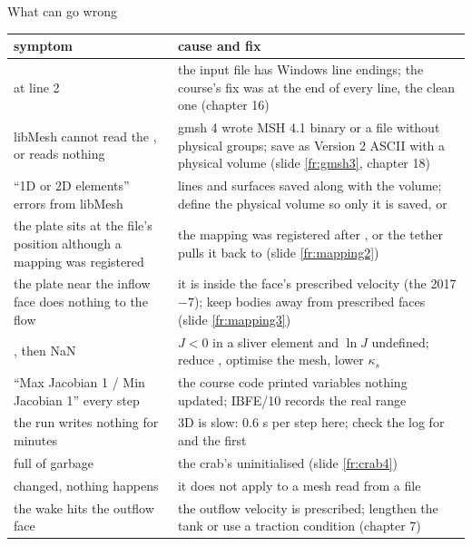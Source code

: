 \documentclass[aspectratio=169,11pt]{beamer}
\begin{document}
\begin{frame}{What can go wrong}
\label{fr:wrong}
\scriptsize
\renewcommand{\arraystretch}{0.92}
\begin{tabular}{@{}L{0.40\textwidth}L{0.52\textwidth}@{}}
\toprule
symptom & cause and fix \\
\midrule
{} at line 2 & the input file has Windows line endings; the course's fix was \code{//} at the end of every line, the clean one  (chapter 16) \\
libMesh cannot read the , or reads nothing & gmsh 4 wrote MSH 4.1 binary or a file without physical groups; save as Version 2 ASCII with a physical volume (slide \ref{fr:gmsh3}, chapter 18) \\
``1D or 2D elements'' errors from libMesh & lines and surfaces saved along with the volume; define the physical volume so only it is saved, or  \\
the plate sits at the file's position although a mapping was registered & the mapping was registered after , or the tether pulls it back to  (slide \ref{fr:mapping2}) \\
the plate near the inflow face does nothing to the flow & it is inside the face's prescribed velocity (the 2017 $-7$); keep bodies away from prescribed faces (slide \ref{fr:mapping3}) \\
, then NaN & $J < 0$ in a sliver element and $\ln J$ undefined; reduce , optimise the mesh, lower $\kappa_s$ \\
``Max Jacobian 1 / Min Jacobian 1'' every step & the course code printed variables nothing updated; IBFE/10 records the real range \\
the run writes nothing for minutes & 3D is slow: $0.6$ s per step here; check the log for  and the first  \\
 full of garbage & the crab's uninitialised  (slide \ref{fr:crab4}) \\
 changed, nothing happens & it does not apply to a mesh read from a file \\
the wake hits the outflow face & the outflow velocity is prescribed; lengthen the tank or use a traction condition (chapter 7) \\
\bottomrule
\end{tabular}
\end{frame}
\end{document}
